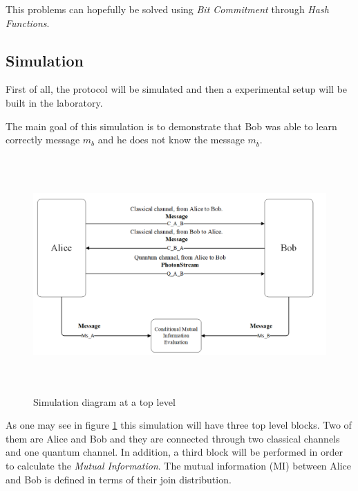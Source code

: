 This problems can hopefully be solved using \textit{Bit Commitment} through \textit{Hash Functions}.


\subsection{Simulation}

First of all, the protocol will be simulated and then a experimental setup will be built in the laboratory.

The main goal of this simulation is to demonstrate that Bob was able to learn correctly message $m_{b}$ and he does not know the message $m_{\overline{b}}$.

\begin{figure}[H]
	\centering
	\includegraphics[width=1.0\textwidth, height=9cm]{./sdf/ot_with_discrete_variables/figures/Simulation_diagram_top.png}
	\caption{Simulation diagram at a top level}\label{toplevelsimulation}
\end{figure}

As one may see in figure \ref{toplevelsimulation} this simulation will have three top level blocks. Two of them are Alice and Bob and they are connected through two classical channels and one quantum channel. In addition, a third block will be performed in order to calculate the \textit{Mutual Information}. The mutual information (MI) between Alice and Bob is defined in terms of their join distribution.


